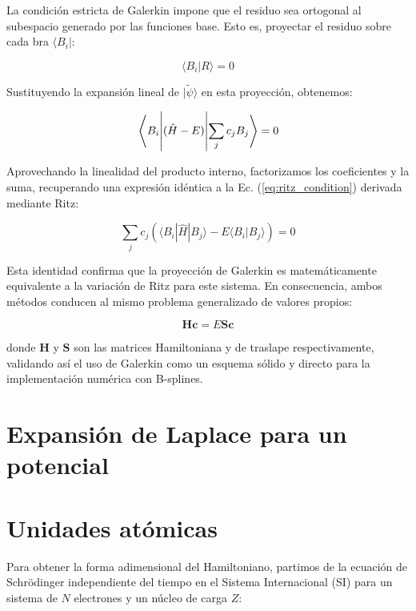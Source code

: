 \documentclass[12pt, a4paper, oneside, spanish]{book}
\begin{document}
La condición estricta de Galerkin impone que el residuo sea ortogonal al subespacio generado por las funciones base. Esto es, proyectar el residuo sobre cada bra \( \langle B_i| \):

\begin{equation}
    \langle B_i | R \rangle = 0
\end{equation}

Sustituyendo la expansión lineal de $|\tilde{\psi}\rangle$ en esta proyección, obtenemos:

\begin{equation}
  \mel{B_i}{(\hat{H} - E)}{\sum_jc_jB_j} = 0
\end{equation}

Aprovechando la linealidad del producto interno, factorizamos los coeficientes y la suma, recuperando una expresión idéntica a la Ec. (\cref{eq:ritz_condition}) derivada mediante Ritz:

\begin{equation}
    \sum_{j} c_j \left( \langle B_i | \hat{H} | B_j \rangle - E \langle B_i | B_j \rangle \right) = 0
\end{equation}

Esta identidad confirma que la proyección de Galerkin es matemáticamente equivalente a la variación de Ritz para este sistema. En consecuencia, ambos métodos conducen al mismo problema generalizado de valores propios:

\begin{equation}
    \mathbf{H}\mathbf{c} = E \mathbf{S}\mathbf{c}
\end{equation}

donde $\mathbf{H}$ y $\mathbf{S}$ son las matrices Hamiltoniana y de traslape respectivamente, validando así el uso de Galerkin como un esquema sólido y directo para la implementación numérica con B-splines.


\printbibliography[heading=bibintoc, title={Referencias Bibliográficas}]

\appendix

\chapter{Expansión de Laplace para un potencial}

\chapter{Unidades atómicas}

Para obtener la forma adimensional del Hamiltoniano, partimos de la ecuación de Schrödinger independiente del tiempo en el Sistema Internacional (SI) para un sistema de $N$ electrones y un núcleo de carga $Z$:
\end{document}
